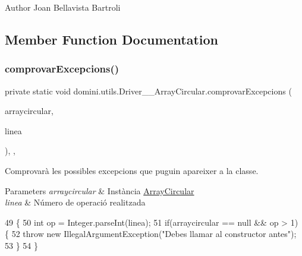 \begin{DoxyAuthor}{Author}
Joan Bellavista Bartroli 
\end{DoxyAuthor}


\subsection{Member Function Documentation}
\mbox{\label{classdomini_1_1utils_1_1Driver____ArrayCircular_a0f5f42c5ace9176cfcae4dfe9717f380}} 
\subsubsection{\texorpdfstring{comprovar\+Excepcions()}{comprovarExcepcions()}}
{\footnotesize\ttfamily private static void domini.\+utils.\+Driver\+\_\+\+\_\+\+Array\+Circular.\+comprovar\+Excepcions (\begin{DoxyParamCaption}\item[{\hyperlink{classdomini_1_1utils_1_1ArrayCircular}{Array\+Circular}}]{arraycircular,  }\item[{String}]{linea }\end{DoxyParamCaption})\hspace{0.3cm}{\ttfamily [inline]}, {\ttfamily [static]}, {\ttfamily [private]}}



Comprovarà les possibles excepcions que puguin apareixer a la classe. 


\begin{DoxyParams}{Parameters}
{\em arraycircular} & Instància \hyperlink{classdomini_1_1utils_1_1ArrayCircular}{Array\+Circular} \\
\hline
{\em linea} & Número de operació realitzada \\
\hline
\end{DoxyParams}

\begin{DoxyCode}
49                                                                                       \{
50         \textcolor{keywordtype}{int} op = Integer.parseInt(linea);
51         \textcolor{keywordflow}{if}(arraycircular == null && op > 1) \{
52             \textcolor{keywordflow}{throw} \textcolor{keyword}{new} IllegalArgumentException(\textcolor{stringliteral}{"Debes llamar al constructor antes"});
53         \}
54     \}
\end{DoxyCode}
\mbox{\label{classdomini_1_1utils_1_1Driver____ArrayCircular_adf8b1dedd521248da8a5f1425dd27af8}} 

